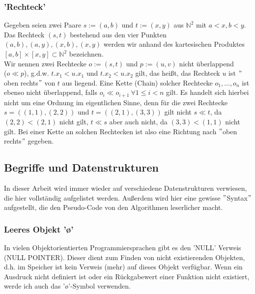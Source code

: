 \subsubsection{'Rechteck'}
Gegeben seien zwei Paare $s:=(a,b)$ und $t:=(x,y)$ aus $\mathbb{N}^2$ mit $a<x,b<y$. Das Rechteck $(s,t)$ bestehend aus den vier Punkten $(a,b),(a,y),(x,b),(x,y)$ werden wir anhand des kartesischen Produktes $[a,b]\times [x,y] \subset \mathbb{N}^2$ bezeichnen.\\
Wir nennen zwei Rechtecke $o:=(s,t)$ und $p:=(u,v)$ nicht überlappend \\($o\ll p$), g.d.w. $t.x_1<u.x_1$ und $t.x_2 < u.x_2$ gilt, das heißt, das Rechteck $u$ ist $"$oben rechts$"$ von $t$ aus liegend. Eine Kette (Chain) solcher Rechtecke $o_1,\dots ,o_n$ ist ebenso nicht überlappend, falls $o_i \ll o_{i+1} ~ \forall 1\leq i< n$ gilt. Es handelt sich hierbei nicht um eine Ordnung im eigentlichen Sinne, denn für die zwei Rechtecke $s=((1,1),(2,2))$ und $t=((2,1),(3,3))$ gilt nicht $s\ll t$, da $(2,2) < (2,1)$ nicht gilt, $t\ll s$ aber auch nicht, da $(3,3) < (1,1)$ nicht gilt. Bei einer Kette an solchen Rechtecken ist also eine Richtung nach $"$oben rechts$"$ gegeben.

\subsection{Begriffe und Datenstrukturen}
In dieser Arbeit wird immer wieder auf verschiedene Datenstrukturen verwiesen, die hier vollständig aufgelistet werden. Außerdem wird hier eine gewisse $"$Syntax$"$ aufgestellt, die den Pseudo-Code von den Algorithmen leserlicher macht.

\subsubsection{Leeres Objekt 'ø'}
In vielen Objektorientierten Programmiersprachen gibt es den 'NULL' Verweis (NULL POINTER). Dieser dient zum Finden von nicht existierenden Objekten, d.h. im Speicher ist kein Verweis (mehr) auf dieses Objekt verfügbar. Wenn ein Ausdruck nicht definiert ist oder ein Rückgabewert einer Funktion nicht existiert, werde ich auch das 'ø'-Symbol verwenden.

